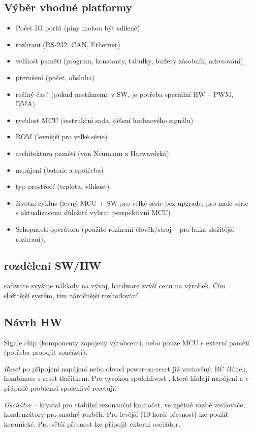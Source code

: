 \documentclass[a4paper, 11pt]{report}
\begin{document}
\subsection{Výběr vhodné platformy}
\begin{itemize}
	\item Počet IO portů (piny mohou být sdílené)
	\item rozhraní (RS-232, CAN, Ethernet)
	\item velikost paměti (program, konstanty, tabulky, buffery zásobník, adresování)
	\item přerušení (počet, obsluha)
	\item reálný čas? (pokud nestihneme v SW, je potřeba speciální HW -- PWM, DMA)
	\item rychlost MCU (instrukční sada, dělení hodinového signálu)
	\item ROM (levnější pro velké série)
	\item architektura paměti (von Neumann x Harwardská)
	\item napájení (baterie a spotřeba)
	\item typ prostředí (teplota, vlhkost)
	\item životní cyklus (levný MCU + SW pro velké série bez upgrade, pro malé série s aktualizacemi důležité vybrat perspektivní MCU)
	\item Schopnosti operátora (použité rozhraní člověk/stroj -- pro laika složitější rozhraní), 
\end{itemize}

\subsection{rozdělení SW/HW}
software zvyšuje náklady na vývoj, hardware zvýší cenu na výrobek. Čím složitější systém, tím náročnější rozhodování.

\subsection{Návrh HW}
Signle chip (komponenty zapojeny výrobcem), nebo pouze MCU s externí pamětí (potřeba propojit součásti).

\emph{Reset} po připojení napájení nebo obvod power-on-reset již vestavěný. RC článek, kombinace s reset tlačítkem. Pro vysokou spolehlivost , které hlídají napájení a v přápadě problémů spolehlivě resetují.

\emph{Oscilátor} -- krystal pro stabilní rezonanční kmitočet, ve zpětné vazbě zesilovače, kondenzátory pro snadný rozběh. Pro levější (10 horší přesnost) lze použít keramické. Pro větší přesnost lze připojit externí oscilátor.
\end{document}
